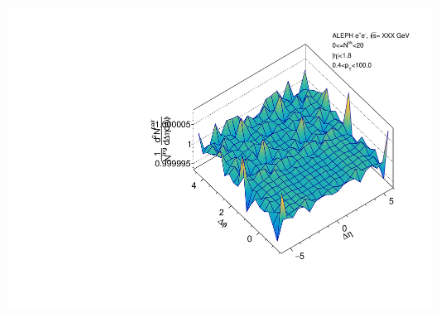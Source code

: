 \begin{figure}[htbp]
\begin{minipage}[b]{0.32\linewidth}
    \label{fig:LEP1 Thrust Axis, Ratio Plot, Multiplicity 0-20, Anthony}
  \end{minipage}
  \begin{minipage}[b]{0.32\linewidth}
    \centering
    \includegraphics[width=\linewidth]{images/TwoParticleCorrelation/LEP1_THRUST/LEP1_THRUST_r_ratio_0_20.pdf}
    \label{fig:LEP1 Thrust Axis, Ratio Plot, Multiplicity 0-20, Ratio}
  \end{minipage}
\end{figure}


